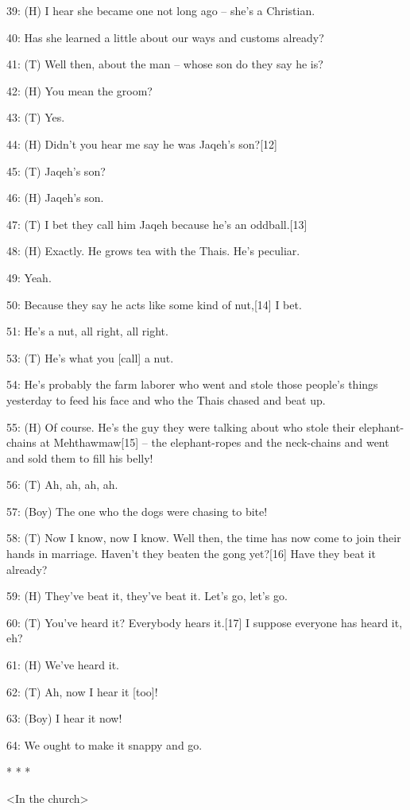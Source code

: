{39: (H) I hear she became one not long ago -- she's a Christian.}

{40: Has she learned a little about our ways and customs already?}

{41: (T) Well then, about the man -- whose son do they say he is?}

{42: (H) You mean the groom?}

{43: (T) Yes.}

{44: (H) Didn't you hear me say he was Jaqeh's son?[12]}

{45: (T) Jaqeh's son?}

{46: (H) Jaqeh's son.}

{47: (T) I bet they call him Jaqeh because he's an oddball.[13]}

{48: (H) Exactly. He grows tea with the Thais. He's peculiar. }

{49: Yeah. }

{50: Because they say he acts like some kind of nut,[14] I bet.}

{51: He's a nut, all right, all right.}

{53: (T) He's what you [call] a nut.}

{54: He's probably the farm laborer who went and stole those people's things
yesterday to feed his face and who the Thais chased and beat up.}

{55: (H) Of course. He's the guy they were talking about who stole their
elephant-chains at Mehthawmaw[15] -- the elephant-ropes and the neck-chains and
went and sold them to fill his belly! }

{56: (T) Ah, ah, ah, ah.}

{57: (Boy) The one who the dogs were chasing to bite!}

{58: (T) Now I know, now I know. Well then, the time has now come to join
their hands in marriage. Haven't they beaten the gong yet?[16] Have they beat it
already?}

{59: (H) They've beat it, they've beat it. Let's go, let's go.}

{60: (T) You've heard it? Everybody hears it.[17] I suppose everyone has
heard it, eh?}

{61: (H) We've heard it.}

{62: (T) Ah, now I hear it [too]!}

{63: (Boy) I hear it now!}

{64: We ought to make it snappy and go.}

\begin{center}
{* * *}

{<In the church>}
\end{center}

